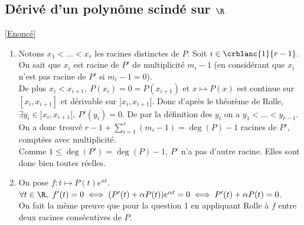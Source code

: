 \documentclass{book}
\begin{document}
	\subsection{Dérivé d'un polynôme scindé sur $\R$ }
	\label{sec:dérivé-d'un-polynôme-scindé-sur-R}
	\textcolor{blue}{\hyperref[Dérivé d'un polynôme scindé sur R]{[Enoncé]}}\\
	\begin{enumerate}[leftmargin=*]
		\item Notons $x_1<\dots<x_r$ les racines distinctes de $P$.
		Soit $i\in \crblanc{1}{r-1}$. On sait que $x_i$ est racine de $P'$ de multiplicité $m_i-1$ (en considérant que $x_i$ n'est pas racine de $P'$ si $m_i-1=0$).\\
		De plus $x_i<x_{i+1},\ P(x_i)=0=P(x_{i+1}) \text{ et }x\mapsto P(x)$ est continue sur $[x_i,x_{i+1}]$ et dérivable sur $]x_i,x_{i+1}[$. Donc d'après le théorème de Rolle, $\exists y_i\in ]x_i,x_{i+1}[,\ P'(y_i)=0$. De par la définition des $y_i$ on a $y_1<\dots<y_{r-1}$.\\
		On a donc trouvé $r-1+\displaystyle\sum\limits_{i=1}^r{(m_i-1)}=\deg(P)-1$ racines de $P'$, comptées avec multiplicité.\\
		Comme $1\leq\deg(P')=\deg(P)-1$, $P'$ n'a pas d'autre racine. Elles sont donc bien toutes réelles.
		\item On pose $f:t\mapsto P(t)e^{\alpha t}$.\\
		$\forall t\in \R,\ f'(t)=0\iff (P'(t)+\alpha P(t))e^{\alpha t}=0\iff P'(t)+\alpha P(t)=0$.\\
		On fait la même preuve que pour la question 1 en appliquant Rolle à $f$ entre deux racines consécutives de $P$.
	\end{enumerate}
	
\end{document}
